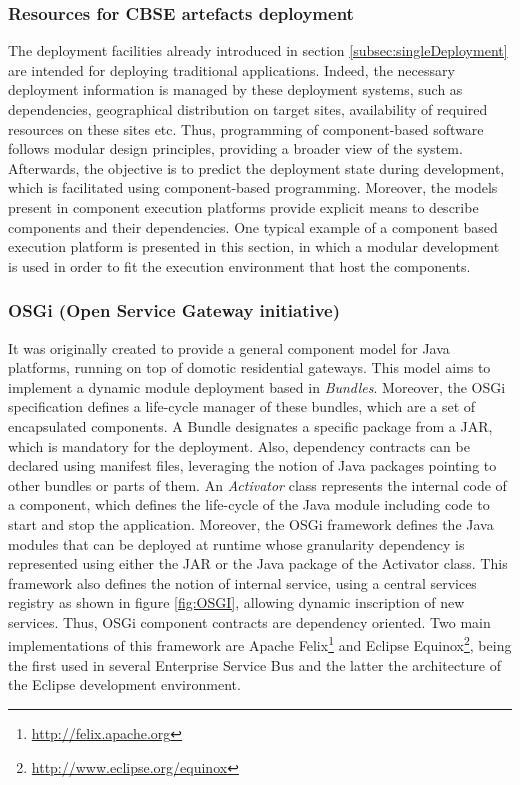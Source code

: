\subsubsection{Resources for CBSE artefacts deployment}
The deployment facilities already introduced in section \ref{subsec:singleDeployment} are intended for deploying traditional applications.
Indeed, the necessary deployment information is managed by these deployment systems, such as dependencies, geographical distribution on target sites, availability of required resources on these sites etc.
Thus, programming of component-based software follows modular design principles, providing a broader view of the system.
Afterwards, the objective is to predict the deployment state during development, which is facilitated using component-based programming.
Moreover, the models present in component execution platforms provide explicit means to describe components and their dependencies.
One typical example of a component based execution platform is presented in this section, in which a modular development is used in order to fit the execution environment that host the components.

\subsubsection*{OSGi (Open Service Gateway initiative)}
It was originally created to provide a general component model for Java platforms, running on top of domotic residential gateways.
This model aims to implement a dynamic module deployment based in \textit{Bundles}.
Moreover, the OSGi specification defines a life-cycle manager of these bundles, which are a set of encapsulated components.
A Bundle designates a specific package from a JAR, which is mandatory for the deployment.
Also, dependency contracts can be declared using manifest files, leveraging the notion of Java packages pointing to other bundles or parts of them.
An \textit{Activator} class represents the internal code of a component, which defines the life-cycle of the Java module including code to start and stop the application.
Moreover, the OSGi framework defines the Java modules that can be deployed at runtime whose granularity dependency is represented using either the JAR or the Java package of the Activator class.
This framework also defines the notion of internal service, using a central services registry as shown in figure \ref{fig:OSGI}, allowing dynamic inscription of new services.
Thus, OSGi component contracts are dependency oriented.
Two main implementations of this framework are Apache Felix\footnote{\url{ http://felix.apache.org}} and Eclipse Equinox\footnote{\url{ http://www.eclipse.org/equinox}}, being the first used in several Enterprise Service Bus and the latter the architecture of the Eclipse development environment.
	
